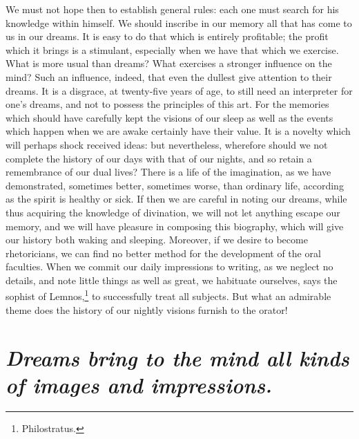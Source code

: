 \documentclass[12pt]{article}
\begin{document}
We must not hope then to establish general rules: each one must search for his
knowledge within himself. We should inscribe in our memory all that has come to
us in our dreams. It is easy to do that which is entirely profitable; the
profit which it brings is a stimulant, especially when we have that which we
exercise. What is more usual than dreams? What exercises a stronger influence
on the mind? Such an influence, indeed, that even the dullest give attention to
their dreams. It is a disgrace, at twenty-five years of age, to still need an
interpreter for one's dreams, and not to possess the principles of this art.
For the memories which should have carefully kept the visions of our sleep as
well as the events which happen when we are awake certainly have their value.
It is a novelty which will perhaps shock received ideas: but nevertheless,
wherefore should we not complete the history of our days with that of our
nights, and so retain a remembrance of our dual lives? There is a life of the
imagination, as we have demonstrated, sometimes better, sometimes worse, than
ordinary life, according as the spirit is healthy or sick. If then we are
careful in noting our dreams, while thus acquiring the knowledge of divination,
we will not let anything escape our memory, and we will have pleasure in
composing this biography, which will give our history both waking and sleeping.
Moreover, if we desire to become rhetoricians, we can find no better method for
the development of the oral faculties. When we commit our daily impressions to
writing, as we neglect no details, and note little things as well as great, we
habituate ourselves, says the sophist of Lemnos,\footnote{Philostratus.} to
successfully treat all subjects. But what an admirable theme does the history
of our nightly visions furnish to the orator!


\section{\mdseries\itshape Dreams bring to the mind all kinds of images and
impressions.}
\end{document}
